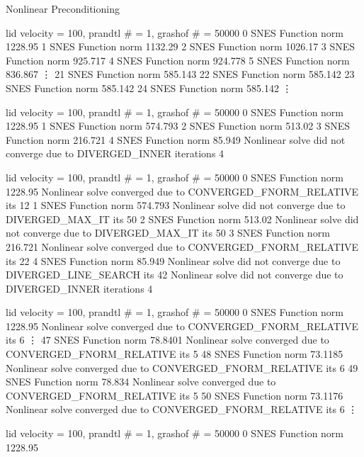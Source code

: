 \begin{frame}[fragile]{Nonlinear Preconditioning}
\begin{overprint}\scriptsize
{}
\begin{semiverbatim}
lid velocity = 100, prandtl \# = 1, grashof \# = 50000
  0 SNES Function norm 1228.95 
  1 SNES Function norm 1132.29 
  2 SNES Function norm 1026.17 
  3 SNES Function norm 925.717 
  4 SNES Function norm 924.778 
  5 SNES Function norm 836.867 
  \vdots
 21 SNES Function norm 585.143 
 22 SNES Function norm 585.142 
 23 SNES Function norm 585.142 
 24 SNES Function norm 585.142 
  \vdots
\end{semiverbatim}
\begin{semiverbatim}
lid velocity = 100, prandtl \# = 1, grashof \# = 50000
  0 SNES Function norm 1228.95 
  1 SNES Function norm 574.793 
  2 SNES Function norm 513.02 
  3 SNES Function norm 216.721 
  4 SNES Function norm 85.949 
Nonlinear solve did not converge due to DIVERGED_INNER iterations 4
\end{semiverbatim}
\begin{semiverbatim}
lid velocity = 100, prandtl \# = 1, grashof \# = 50000
  0 SNES Function norm 1228.95 
    Nonlinear solve converged due to CONVERGED_FNORM_RELATIVE its 12
  1 SNES Function norm 574.793 
    Nonlinear solve did not converge due to DIVERGED_MAX_IT its 50
  2 SNES Function norm 513.02 
    Nonlinear solve did not converge due to DIVERGED_MAX_IT its 50
  3 SNES Function norm 216.721 
    Nonlinear solve converged due to CONVERGED_FNORM_RELATIVE its 22
  4 SNES Function norm 85.949 
    Nonlinear solve did not converge due to DIVERGED_LINE_SEARCH its 42
Nonlinear solve did not converge due to DIVERGED_INNER iterations 4
\end{semiverbatim}
\begin{semiverbatim}
lid velocity = 100, prandtl \# = 1, grashof \# = 50000
  0 SNES Function norm 1228.95 
    Nonlinear solve converged due to CONVERGED_FNORM_RELATIVE its 6
  \vdots
 47 SNES Function norm 78.8401 
    Nonlinear solve converged due to CONVERGED_FNORM_RELATIVE its 5
 48 SNES Function norm 73.1185 
    Nonlinear solve converged due to CONVERGED_FNORM_RELATIVE its 6
 49 SNES Function norm 78.834 
    Nonlinear solve converged due to CONVERGED_FNORM_RELATIVE its 5
 50 SNES Function norm 73.1176 
    Nonlinear solve converged due to CONVERGED_FNORM_RELATIVE its 6
  \vdots
\end{semiverbatim}
\begin{semiverbatim}
lid velocity = 100, prandtl \# = 1, grashof \# = 50000
  0 SNES Function norm 1228.95 

\end{semiverbatim}
\end{overprint}
\end{frame}
